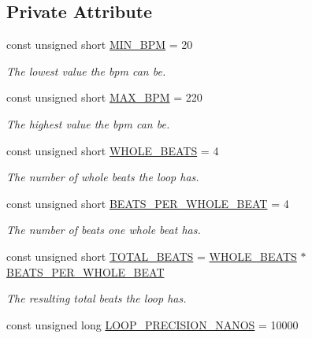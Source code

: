 \subsection*{Private Attribute}
\begin{DoxyCompactItemize}
\item 
const unsigned short \hyperlink{class_drum_machine_a221c0cd8b5cf3f2342f57ad539d3628a}{M\+I\+N\+\_\+\+B\+PM} = 20
\begin{DoxyCompactList}\small\item\em The lowest value the bpm can be. \end{DoxyCompactList}\item 
const unsigned short \hyperlink{class_drum_machine_a0b64f2e265bb9fc06729090b7e05c005}{M\+A\+X\+\_\+\+B\+PM} = 220
\begin{DoxyCompactList}\small\item\em The highest value the bpm can be. \end{DoxyCompactList}\item 
const unsigned short \hyperlink{class_drum_machine_a54e06658e13970dc7679051e8194f546}{W\+H\+O\+L\+E\+\_\+\+B\+E\+A\+TS} = 4
\begin{DoxyCompactList}\small\item\em The number of whole beats the loop has. \end{DoxyCompactList}\item 
const unsigned short \hyperlink{class_drum_machine_ab4d2056f29b6eb959aa379afcc6b70f0}{B\+E\+A\+T\+S\+\_\+\+P\+E\+R\+\_\+\+W\+H\+O\+L\+E\+\_\+\+B\+E\+AT} = 4
\begin{DoxyCompactList}\small\item\em The number of beats one whole beat has. \end{DoxyCompactList}\item 
const unsigned short \hyperlink{class_drum_machine_a25ff7c6556614ab787a626a5c6ec1683}{T\+O\+T\+A\+L\+\_\+\+B\+E\+A\+TS} = \hyperlink{class_drum_machine_a54e06658e13970dc7679051e8194f546}{W\+H\+O\+L\+E\+\_\+\+B\+E\+A\+TS} $\ast$ \hyperlink{class_drum_machine_ab4d2056f29b6eb959aa379afcc6b70f0}{B\+E\+A\+T\+S\+\_\+\+P\+E\+R\+\_\+\+W\+H\+O\+L\+E\+\_\+\+B\+E\+AT}
\begin{DoxyCompactList}\small\item\em The resulting total beats the loop has. \end{DoxyCompactList}\item 
const unsigned long \hyperlink{class_drum_machine_a847e09081c90dbb33c602506d5adb743}{L\+O\+O\+P\+\_\+\+P\+R\+E\+C\+I\+S\+I\+O\+N\+\_\+\+N\+A\+N\+OS} = 10000

\end{DoxyCompactItemize}
